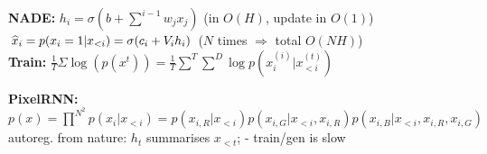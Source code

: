 \textbf{NADE:} $h_i = \sigma(b + \sum^{i-1} w_j x_j)$ (in $O(H)$, update in $O(1)$)\\
$\widehat{x}_i = p(x_i=1| x_{<i}) = \sigma(c_i + V_i h_i)$ ($N$ times $\Rightarrow$ total $O(NH)$)\\
\textbf{Train:} $\frac{1}{T} \Sigma \log(p(x^t)) = \frac{1}{T} \sum^T \sum^D \log p(x_i^{(i)}| x_{<i}^{(t)})$\\

\textbf{PixelRNN:} $p(x) = \prod^{N^2} p(x_i | x_{<i}) = p(x_{i,R} | x_{<i}) p(x_{i,G} | x_{<i}, x_{i,R}) p(x_{i,B} | x_{<i}, x_{i,R}, x_{i,G})$\\
autoreg. from nature: $h_t$ summarises $x_{<t}$; - train/gen is slow\\

